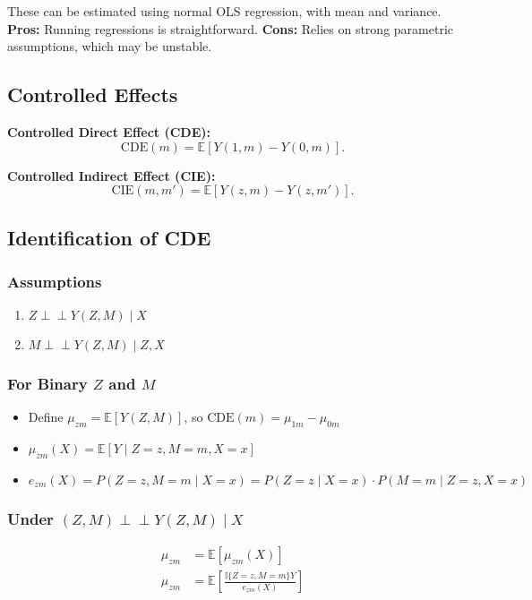 These can be estimated using normal OLS regression, with mean and variance.  
\textbf{Pros:} Running regressions is straightforward.  
\textbf{Cons:} Relies on strong parametric assumptions, which may be unstable.

\subsection*{Controlled Effects}

\textbf{Controlled Direct Effect (CDE):}
\[
\text{CDE}(m) = \mathbb{E}[Y(1, m) - Y(0, m)].
\]

\textbf{Controlled Indirect Effect (CIE):}
\[
\text{CIE}(m, m') = \mathbb{E}[Y(z, m) - Y(z, m')].
\]
\subsection*{Identification of CDE}

\subsubsection*{Assumptions}
\begin{enumerate}
    \item $Z \perp\!\!\!\perp Y(Z, M) \mid X$
    \item $M \perp\!\!\!\perp Y(Z, M) \mid Z, X$
\end{enumerate}

\subsubsection*{For Binary $Z$ and $M$}
\begin{itemize}
    \item Define $\mu_{zm} = \mathbb{E}[Y(Z, M)]$, so $\text{CDE}(m) = \mu_{1m} - \mu_{0m}$
    \item $\mu_{zm}(X) = \mathbb{E}[Y \mid Z = z, M = m, X = x]$
    \item $e_{zm}(X) = P(Z = z, M = m \mid X = x) = P(Z = z \mid X = x) \cdot P(M = m \mid Z = z, X = x)$
\end{itemize}

\subsubsection*{Under $(Z, M) \perp\!\!\!\perp Y(Z, M) \mid X$}
\begin{align*}
    \mu_{zm} &= \mathbb{E}[\mu_{zm}(X)] \\
    \mu_{zm} &= \mathbb{E} \left[ \frac{\mathbb{I}\{Z = z, M = m\} Y}{e_{zm}(X)} \right]
\end{align*}

